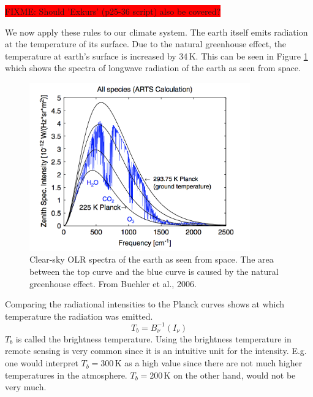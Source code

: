 \colorbox{red}{FIXME: Should 'Exkurs' (p25-36 script) also be covered?} \vspace{1cm}

We now apply these rules to our climate system. The earth itself emits radiation at the temperature of its surface. Due to the natural greenhouse effect, the temperature at earth's surface is increased by 34\,K. This can be seen in Figure \ref{Buehler_et_al_OLR_spectra} which shows the spectra of longwave radiation of the earth as seen from space.

 \begin{figure}
\begin{center}
\includegraphics[width=0.85\textwidth]{figures/Buehler_et_al_OLR_spectra}
\caption{Clear-sky OLR spectra of the earth as seen from space. The area between the top curve and the blue curve is caused by the natural greenhouse effect. From Buehler et al., 2006.}
\label{Buehler_et_al_OLR_spectra}
\end{center}
\end{figure}

Comparing the radiational intensities to the Planck curves shows at which temperature the radiation was emitted. 
\begin{equation}
T_b = B^{-1}_{\nu}(I_{\nu})
\end{equation}
$T_b$ is called the brightness temperature. Using the brightness temperature in remote sensing is very common since it is an intuitive unit for the intensity. E.g. one would interpret $T_b = 300$\,K as a high value since there are not much higher temperatures in the atmosphere. $T_b = 200$\,K on the other hand, would not be very much.
 


